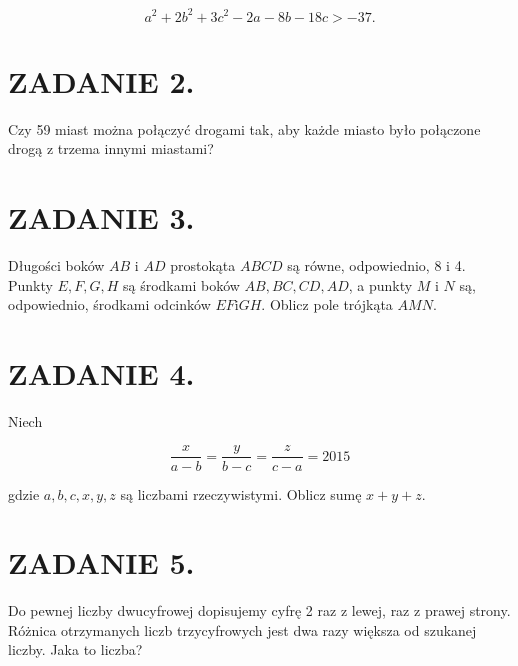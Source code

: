 \documentclass[10pt]{article}
\begin{document}
\[
a^{2}+2 b^{2}+3 c^{2}-2 a-8 b-18 c>-37 .
\]

\section*{ZADANIE 2.}
Czy 59 miast można połączyć drogami tak, aby każde miasto było połączone drogą z trzema innymi miastami?

\section*{ZADANIE 3.}
Długości boków \(A B\) i \(A D\) prostokąta \(A B C D\) są równe, odpowiednio, 8 i 4. Punkty \(E, F, G, H\) są środkami boków \(A B, B C, C D, A D\), a punkty \(M\) i \(N\) są, odpowiednio, środkami odcinków \(E F \mathrm{i} G H\). Oblicz pole trójkąta \(A M N\).

\section*{ZADANIE 4.}
Niech

\[
\frac{x}{a-b}=\frac{y}{b-c}=\frac{z}{c-a}=2015
\]

gdzie \(a, b, c, x, y, z\) są liczbami rzeczywistymi. Oblicz sumę \(x+y+z\).

\section*{ZADANIE 5.}
Do pewnej liczby dwucyfrowej dopisujemy cyfrę 2 raz z lewej, raz z prawej strony. Różnica otrzymanych liczb trzycyfrowych jest dwa razy większa od szukanej liczby. Jaka to liczba?
\end{document}
